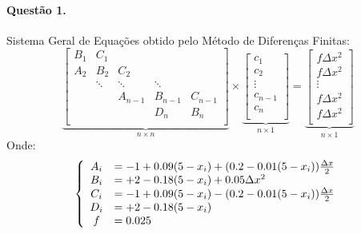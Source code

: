 \documentclass{article}
\begin{document}
        \paragraph{Questão 1.}Sistema Geral de Equações obtido pelo Método de Diferenças Finitas:
            \[
                \underbrace{\begin{bmatrix}
                    B_{1} & C_{1}  &         &         & \\
                    A_{2} & B_{2}  & C_{2}   &         & \\
                          & \ddots & \ddots  & \ddots  & \\
                          &        & A_{n-1} & B_{n-1} & C_{n-1}\\
                          &        &         & D_{n}   & B_{n}\\
                \end{bmatrix}}_{n \times n} \times
                \underbrace{\begin{bmatrix}
                    c_{1}\\
                    c_{2}\\
                    \vdots\\
                    c_{n-1}\\
                    c_{n}\\
                \end{bmatrix}}_{n \times 1} = 
                \underbrace{\begin{bmatrix}
                    f\Delta x^2\\
                    f\Delta x^2\\
                    \vdots\\
                    f\Delta x^2\\
                    f\Delta x^2\\
                \end{bmatrix}}_{n \times 1}
            \]
        Onde:
            \[
                \left\{
                    \begin{array}{c l}
                        A_{i}    & = -1 + 0.09(5 - x_{i}) + (0.2 - 0.01(5-x_{i}))\frac{\Delta x}{2}\\
                        B_{i}    & = +2 - 0.18(5 - x_{i}) + 0.05\Delta x^2\\
                        C_{i}    & = -1 + 0.09(5 - x_{i}) - (0.2 - 0.01(5-x_{i}))\frac{\Delta x}{2}\\
                        D_{i}    & = +2 - 0.18(5 - x_{i})\\
                        f        & = 0.025
                    \end{array}
                \right.
            \]
\end{document}
